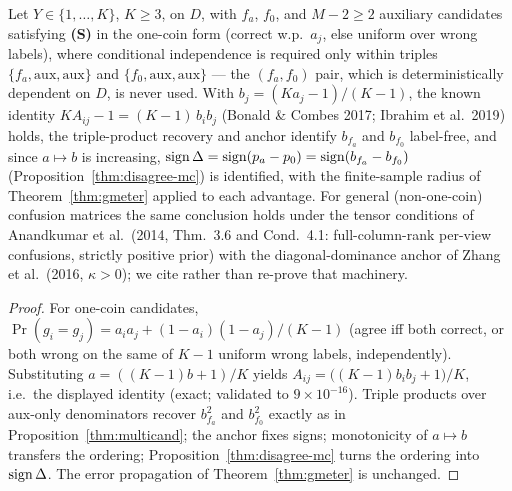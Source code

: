 \begin{theorem}\label{thm:conj1-multiclass}
Let $Y\in\{1,\dots,K\}$, $K\ge3$, on $D$, with $f_a$, $f_0$, and $M{-}2\ge2$
auxiliary candidates satisfying \textnormal{\textbf{(S)}} in the one-coin form
(correct w.p.\ $a_j$, else uniform over wrong labels), where conditional
independence is required only within triples $\{f_a,\mathrm{aux},\mathrm{aux}\}$
and $\{f_0,\mathrm{aux},\mathrm{aux}\}$ --- the $(f_a,f_0)$ pair, which is
deterministically dependent on $D$, is never used. With
$b_j=(Ka_j-1)/(K-1)$, the known identity $K A_{ij}-1=(K-1)\,b_ib_j$
{\rm(}Bonald \& Combes 2017; Ibrahim et al.\ 2019{\rm)} holds, the
triple-product recovery and anchor identify $b_{f_a}$ and $b_{f_0}$
label-free, and since $a\mapsto b$ is increasing,
$\operatorname{sign}\Delta=\operatorname{sign}(p_a-p_0)=\operatorname{sign}(b_{f_a}-b_{f_0})$
(Proposition~\ref{thm:disagree-mc}) is identified, with the finite-sample
radius of Theorem~\ref{thm:gmeter} applied to each advantage. For general
(non-one-coin) confusion matrices the same conclusion holds under the tensor
conditions of Anandkumar et al.\ (2014, Thm.~3.6 and Cond.~4.1: full-column-rank
per-view confusions, strictly positive prior) with the diagonal-dominance
anchor of Zhang et al.\ (2016, $\kappa>0$); we cite rather than re-prove that
machinery.
\end{theorem}
\begin{proof}
For one-coin candidates, $\Pr(g_i{=}g_j)=a_ia_j+(1-a_i)(1-a_j)/(K-1)$
(agree iff both correct, or both wrong on the same of $K{-}1$ uniform wrong
labels, independently). Substituting $a=((K{-}1)b+1)/K$ yields
$A_{ij}=\bigl((K{-}1)b_ib_j+1\bigr)/K$, i.e.\ the displayed identity (exact;
validated to $9{\times}10^{-16}$). Triple products over aux-only denominators
recover $b_{f_a}^2$ and $b_{f_0}^2$ exactly as in
Proposition~\ref{thm:multicand}; the anchor fixes signs; monotonicity of
$a\mapsto b$ transfers the ordering; Proposition~\ref{thm:disagree-mc} turns the
ordering into $\operatorname{sign}\Delta$. The error propagation of
Theorem~\ref{thm:gmeter} is unchanged.
\end{proof}

